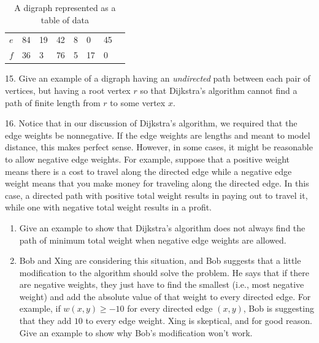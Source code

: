 \documentclass[10pt,]{book}
\theoremstyle{plain}
\theoremstyle{definition}
\theoremstyle{definition}
\theoremstyle{definition}
\theoremstyle{definition}
\numberwithin{equation}{section}
\begin{document}
\begin{exerciselist}
\begin{table}
\begin{tabular}{lAllllll}
\(e\)&84&19&42&8&0&45\tabularnewline[0pt]
\(f\)&36&3&76&5&17&0
\end{tabular}
\caption{A digraph represented as a table of data\label{tab_digraph2}}
\end{table}
\par\smallskip
\item[15.]\hypertarget{exercise-27}{}\hypertarget{p-269}{}%
Give an example of a digraph having an \emph{undirected} path between each pair of vertices, but having a root vertex \(r\) so that Dijkstra's algorithm cannot find a path of finite length from \(r\) to some vertex \(x\).%
\par\smallskip
\item[16.]\hypertarget{exercise-28}{}\hypertarget{p-270}{}%
Notice that in our discussion of Dijkstra's algorithm, we required that the edge weights be nonnegative. If the edge weights are lengths and meant to model distance, this makes perfect sense. However, in some cases, it might be reasonable to allow negative edge weights. For example, suppose that a positive weight means there is a cost to travel along the directed edge while a negative edge weight means that you make money for traveling along the directed edge. In this case, a directed path with positive total weight results in paying out to travel it, while one with negative total weight results in a profit. \leavevmode%
\begin{enumerate}[label=(\alph*)]
\item\hypertarget{li-51}{}\hypertarget{p-271}{}%
Give an example to show that Dijkstra's algorithm does not always find the path of minimum total weight when negative edge weights are allowed.%
\item\hypertarget{li-52}{}\hypertarget{p-272}{}%
Bob and Xing are considering this situation, and Bob suggests that a little modification to the algorithm should solve the problem. He says that if there are negative weights, they just have to find the smallest (i.e.\@, most negative weight) and add the absolute value of that weight to every directed edge. For example, if \(w(x,y)\geq -10\) for every directed edge \((x,y)\), Bob is suggesting that they add \(10\) to every edge weight. Xing is skeptical, and for good reason. Give an example to show why Bob's modification won't work.%
\end{enumerate}
%
\par\smallskip
\end{exerciselist}
\typeout{************************************************}
\typeout{************************************************}
\end{document}
